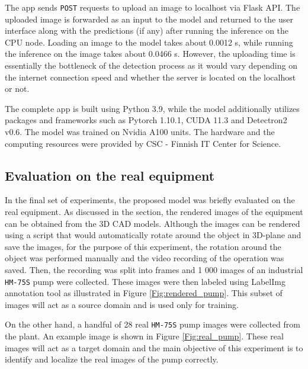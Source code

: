 The app sends \texttt{POST} requests to upload an image to localhost via Flask API. The uploaded image is forwarded as an input to the model and returned to the user interface along with the predictions (if any) after running the inference on the CPU node. Loading an image to the model takes about 0.0012 s, while running the inference on the image takes about 0.0466 s. However, the uploading time is essentially the bottleneck of the detection process as it would vary depending on the internet connection speed and whether the server is located on the localhost or not. 

The complete app is built using Python 3.9, while the model additionally utilizes packages and frameworks such as Pytorch 1.10.1, CUDA 11.3 and Detectron2 v0.6. The model was trained on Nvidia A100 units. The hardware and the computing resources were provided by CSC - Finnish IT Center for Science. 


\FloatBarrier

\clearpage

\subsection{Evaluation on the real equipment}
\label{real_equipment_tests} 
In the final set of experiments, the proposed model was briefly evaluated on the real equipment. As discussed in the  section, the rendered images of the equipment can be obtained from the 3D CAD models. Although the images can be rendered using a script that would automatically rotate around the object in 3D-plane and save the images, for the purpose of this experiment, the rotation around the object was performed manually and the video recording of the operation was saved. Then, the recording was split into frames and 1 000 images of an industrial \texttt{HM-75S} pump were collected. These images were then labeled using LabelImg \cite{2015} annotation tool as illustrated in Figure \ref{Fig:rendered_pump}. This subset of images will act as a source domain and is used only for training. 

On the other hand, a handful of 28 real \texttt{HM-75S} pump images were collected from the plant. An example image is shown in Figure \ref{Fig:real_pump}. These real images will act as a target domain and the main objective of this experiment is to identify and localize the real images of the pump correctly. 


